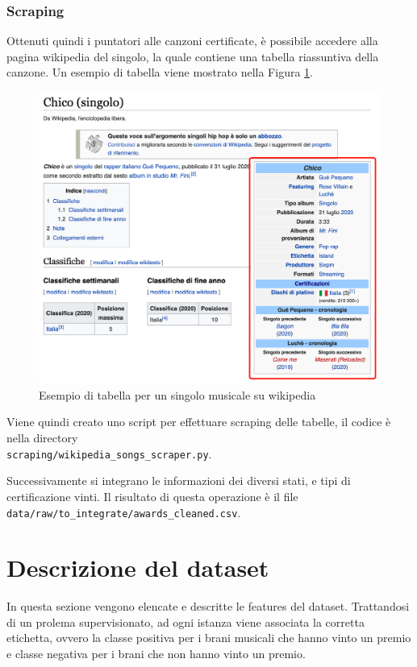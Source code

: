 \subsubsection{Scraping}
Ottenuti quindi i puntatori alle canzoni certificate, è possibile accedere alla pagina wikipedia del singolo, la quale contiene una tabella riassuntiva della canzone. Un esempio di tabella viene mostrato nella Figura \ref{fig:wiki_table}.
\begin{figure}[H]
	\centering
	\includegraphics[width=12cm]{assets/wikipedia-table.png}
	\caption{Esempio di tabella per un singolo musicale su wikipedia}
	\label{fig:wiki_table}
\end{figure}

Viene quindi creato uno script per effettuare scraping delle tabelle, il codice è nella directory\\ \verb|scraping/wikipedia_songs_scraper.py|.

Successivamente si integrano le informazioni dei diversi stati, e tipi di certificazione vinti. Il risultato di questa operazione è il file \verb|data/raw/to_integrate/awards_cleaned.csv|.

\section{Descrizione del dataset}
In questa sezione vengono elencate e descritte le features del dataset. Trattandosi di un prolema supervisionato, ad ogni istanza viene associata la corretta etichetta, ovvero la classe positiva per i brani musicali che hanno vinto un premio e classe negativa per i brani che non hanno vinto un premio.

